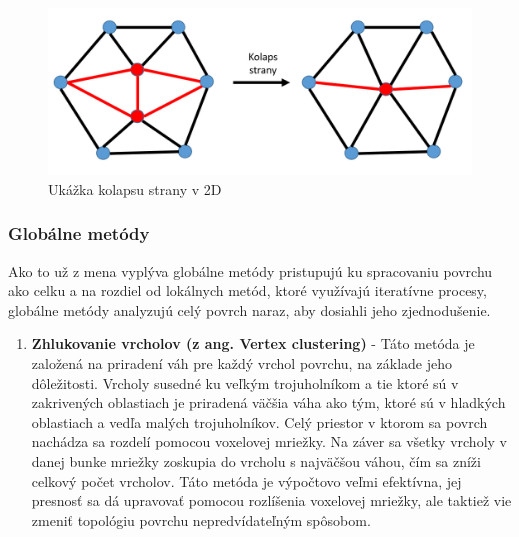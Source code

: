 \begin{enumerate}
    \begin{figure}[!htbp]
      \centering
      \includegraphics[width=12 cm]{img/edge_collapse.png}
      \caption{Ukážka kolapsu strany v 2D} 
      \label{fig:vertex_decim}
    \end{figure} 
\end{enumerate}

\subsubsection{Globálne metódy}
\noindent Ako to už z mena vyplýva globálne metódy pristupujú ku spracovaniu povrchu ako celku a na rozdiel od lokálnych metód, ktoré využívajú iteratívne procesy, globálne metódy analyzujú celý povrch naraz, aby dosiahli jeho zjednodušenie.
\begin{enumerate}
    \item\textbf{Zhlukovanie vrcholov (z ang. Vertex clustering)} - Táto metóda je založená na priradení váh pre každý vrchol povrchu, na základe jeho dôležitosti. Vrcholy susedné ku veľkým trojuholníkom a tie ktoré sú v zakrivených oblastiach je priradená väčšia váha ako tým, ktoré sú v hladkých oblastiach a vedľa malých trojuholníkov. Celý priestor v ktorom sa povrch nachádza sa rozdelí pomocou voxelovej mriežky. Na záver sa všetky vrcholy v danej bunke mriežky zoskupia do vrcholu s najväčšou váhou, čím sa zníži celkový počet vrcholov. Táto metóda je výpočtovo veľmi efektívna, jej presnosť sa dá upravovať pomocou rozlíšenia voxelovej mriežky, ale taktiež vie zmeniť topológiu povrchu nepredvídateľným spôsobom. \cite{mesh_simplification}
\end{enumerate}

